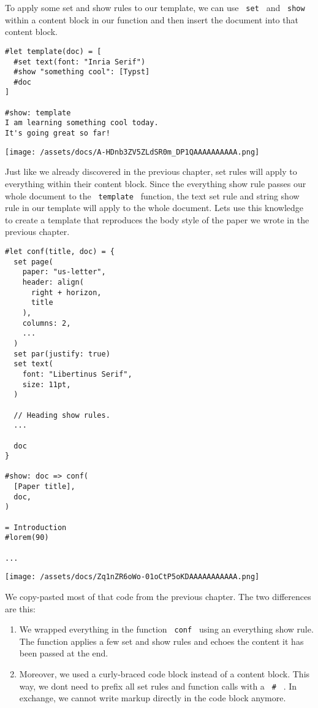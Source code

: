 To apply some set and show rules to our template, we can use
\texttt{\ set\ } and \texttt{\ show\ } within a content block in our
function and then insert the document into that content block.

\begin{verbatim}
#let template(doc) = [
  #set text(font: "Inria Serif")
  #show "something cool": [Typst]
  #doc
]

#show: template
I am learning something cool today.
It's going great so far!
\end{verbatim}

\texttt{[image: /assets/docs/A-HDnb3ZV5ZLdSR0m\_DP1QAAAAAAAAAA.png]}

Just like we already discovered in the previous chapter, set rules will
apply to everything within their content block. Since the everything
show rule passes our whole document to the \texttt{\ template\ }
function, the text set rule and string show rule in our template will
apply to the whole document. Let\textquotesingle s use this knowledge to
create a template that reproduces the body style of the paper we wrote
in the previous chapter.

\begin{verbatim}
#let conf(title, doc) = {
  set page(
    paper: "us-letter",
    header: align(
      right + horizon,
      title
    ),
    columns: 2,
    ...
  )
  set par(justify: true)
  set text(
    font: "Libertinus Serif",
    size: 11pt,
  )

  // Heading show rules.
  ...

  doc
}

#show: doc => conf(
  [Paper title],
  doc,
)

= Introduction
#lorem(90)

...
\end{verbatim}

\texttt{[image: /assets/docs/Zq1nZR6oWo-01oCtP5oKDAAAAAAAAAAA.png]}

We copy-pasted most of that code from the previous chapter. The two
differences are this:

\begin{enumerate}
\item
  We wrapped everything in the function \texttt{\ conf\ } using an
  everything show rule. The function applies a few set and show rules
  and echoes the content it has been passed at the end.
\item
  Moreover, we used a curly-braced code block instead of a content
  block. This way, we don\textquotesingle t need to prefix all set rules
  and function calls with a \texttt{\ \#\ } . In exchange, we cannot
  write markup directly in the code block anymore.
\end{enumerate}

